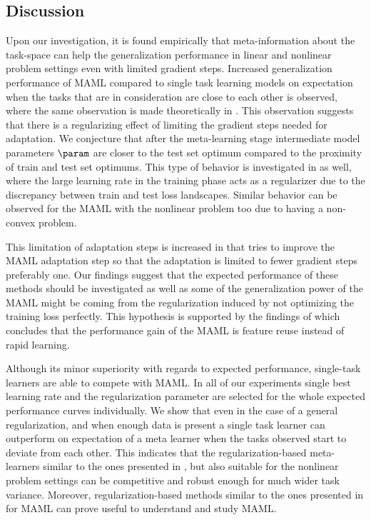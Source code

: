 \subsection{Discussion}

Upon our investigation, it is found empirically that meta-information about the task-space can help the generalization performance in linear and nonlinear problem settings even with limited gradient steps. Increased generalization performance of MAML compared to single task learning models on expectation when the tasks that are in consideration are close to each other is observed, where the same observation is made theoretically in \cite{fallah2021}. This observation suggests that there is a regularizing effect of limiting the gradient steps needed for adaptation. We conjecture that after the meta-learning stage intermediate model parameters $\param$ are closer to the test set optimum compared to the proximity of train and test set optimums. This type of behavior is investigated in \cite{nakkiran2020} as well, where the large learning rate in the training phase acts as a regularizer due to the discrepancy between train and test loss landscapes. Similar behavior can be observed for the MAML with the nonlinear problem too due to having a non-convex problem. 

This limitation of adaptation steps is increased in \cite{behl2019,li2017b} that tries to improve the MAML adaptation step so that the adaptation is limited to fewer gradient steps preferably one. Our findings suggest that the expected performance of these methods should be investigated as well as some of the generalization power of the MAML might be coming from the regularization induced by not optimizing the training loss perfectly. This hypothesis is supported by the findings of \cite{raghu2020} which concludes that the performance gain of the MAML is feature reuse instead of rapid learning.

Although its minor superiority with regards to expected performance, single-task learners are able to compete with MAML. In all of our experiments single best learning rate and the regularization parameter are selected for the whole expected performance curves individually. We show that even in the case of a general regularization, and when enough data is present a single task learner can outperform on expectation of a meta learner when the tasks observed start to deviate from each other. This indicates that the regularization-based meta-learners similar to the ones presented in \cite{denevi2018}, but also suitable for the nonlinear problem settings  can be competitive and robust enough for much wider task variance. Moreover, regularization-based methods similar to the ones presented in \cite{guiroy2019} for MAML can prove useful to understand and study MAML.


